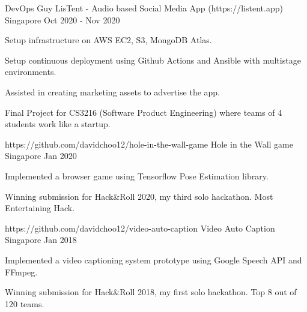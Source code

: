 

\begin{cventries}

  \cventry
    {DevOps Guy} %
    {LisTent - Audio based Social Media App (https://listent.app)} %
    {Singapore} %
    {Oct 2020 - Nov 2020} %
    {
      \begin{cvitems} %
        \item {Setup infrastructure on AWS EC2, S3, MongoDB Atlas.}
        \item {Setup continuous deployment using Github Actions and Ansible with multistage environments.}
        \item {Assisted in creating marketing assets to advertise the app.}
        \item {Final Project for CS3216 (Software Product Engineering) where teams of 4 students work like a startup.}
      \end{cvitems}
    }

  \cventry
    {https://github.com/davidchoo12/hole-in-the-wall-game} %
    {Hole in the Wall game} %
    {Singapore} %
    {Jan 2020} %
    {
      \begin{cvitems} %
        \item {Implemented a browser game using Tensorflow Pose Estimation library.}
        \item {Winning submission for Hack\&Roll 2020, my third solo hackathon. Most Entertaining Hack.}
      \end{cvitems}
    }

  \cventry
    {https://github.com/davidchoo12/video-auto-caption} %
    {Video Auto Caption} %
    {Singapore} %
    {Jan 2018} %
    {
      \begin{cvitems} %
        \item {Implemented a video captioning system prototype using Google Speech API and FFmpeg.}
        \item {Winning submission for Hack\&Roll 2018, my first solo hackathon. Top 8 out of 120 teams.}
      \end{cvitems}
    }


\end{cventries}
